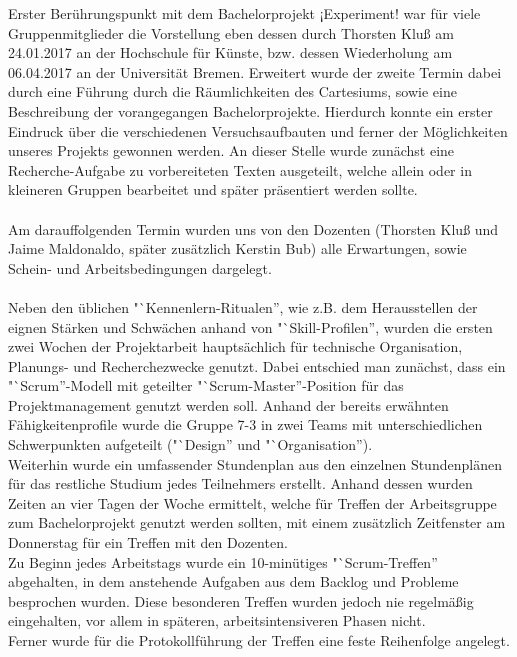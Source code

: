 \documentclass{Bericht}
\begin{document}
		Erster Berührungspunkt mit dem Bachelorprojekt ¡Experiment! war für viele Gruppenmitglieder die Vorstellung eben dessen durch Thorsten Kluß am 24.01.2017 an der Hochschule für Künste, bzw. dessen Wiederholung am 06.04.2017 an der Universität Bremen. Erweitert wurde der zweite Termin dabei durch eine Führung durch die Räumlichkeiten des Cartesiums, sowie eine Beschreibung der vorangegangen Bachelorprojekte. Hierdurch konnte ein erster Eindruck über die verschiedenen Versuchsaufbauten und ferner der Möglichkeiten unseres Projekts gewonnen werden. An dieser Stelle wurde zunächst eine Recherche-Aufgabe zu vorbereiteten Texten ausgeteilt, welche allein oder in kleineren Gruppen bearbeitet und später präsentiert werden sollte.\\
\\
		Am darauffolgenden Termin wurden uns von den Dozenten (Thorsten Kluß und Jaime Maldonaldo, später zusätzlich Kerstin Bub) alle Erwartungen, sowie Schein- und Arbeitsbedingungen dargelegt.\\
\\
		Neben den üblichen "`Kennenlern-Ritualen'', wie z.B. dem Herausstellen der eignen Stärken und Schwächen anhand von "`Skill-Profilen'', wurden die ersten zwei Wochen der Projektarbeit hauptsächlich für technische Organisation, Planungs- und Recherchezwecke genutzt. Dabei entschied man zunächst, dass ein "`Scrum''-Modell mit geteilter "`Scrum-Master''-Position für das Projektmanagement genutzt werden soll. Anhand der bereits erwähnten Fähigkeitenprofile wurde die Gruppe 7-3 in zwei Teams mit unterschiedlichen Schwerpunkten aufgeteilt ("`Design'' und "`Organisation'').\\
		Weiterhin wurde ein umfassender Stundenplan aus den einzelnen Stundenplänen für das restliche Studium jedes Teilnehmers erstellt. Anhand dessen wurden Zeiten an vier Tagen der Woche ermittelt, welche für Treffen der Arbeitsgruppe zum Bachelorprojekt genutzt werden sollten, mit einem zusätzlich Zeitfenster am Donnerstag für ein Treffen mit den Dozenten. \\
		Zu Beginn jedes Arbeitstags wurde ein 10-minütiges "`Scrum-Treffen'' abgehalten, in dem anstehende Aufgaben aus dem Backlog und Probleme besprochen wurden. Diese besonderen Treffen wurden jedoch nie regelmäßig eingehalten, vor allem in späteren, arbeitsintensiveren Phasen nicht.\\
		Ferner wurde für die Protokollführung der Treffen eine feste Reihenfolge angelegt.\\
\end{document}
